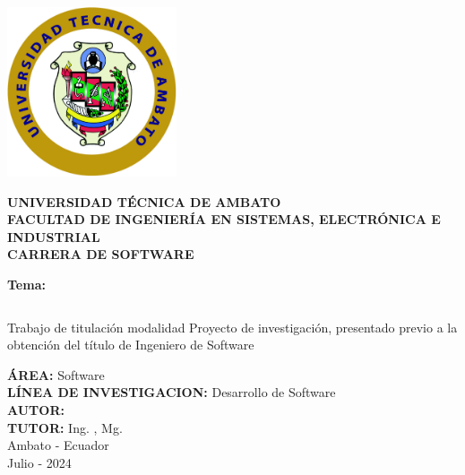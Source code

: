 \begin{titlepage}
	\begin{center}

		\includegraphics[width=50mm]{resources/images/logo-uta.png}

		\textbf{\uppercase{
				Universidad Técnica de Ambato \\
				\vspace{5mm}
				Facultad de Ingeniería en sistemas, electrónica e industrial \\
				\vspace{5mm}
				carrera de software \\
			}}

		\vspace{5mm}
		\textbf{Tema:}
		\vspace{5mm}

		\begin{tabular}[c]{>{\centering\arraybackslash}p{}}
			\toprule
			{\bfseries\MakeUppercase\tema} \\
			\bottomrule
		\end{tabular}

		\vspace{24pt}
		Trabajo de titulación modalidad Proyecto de investigación, presentado
		previo a la obtención del título de Ingeniero de Software

		\vspace{5mm}
		\textbf{\uppercase{área:}} Software\\
		\vspace{5mm}
		\textbf{\uppercase{línea de investigacion:}} Desarrollo de Software\\
		\vspace{5mm}
		\textbf{\uppercase{autor:}} \autor \\
		\vspace{5mm}
		\textbf{\uppercase{tutor:}} Ing. \tutor, Mg.\\

		\vfill
		Ambato - Ecuador\\
		Julio - 2024

	\end{center}
\end{titlepage}
